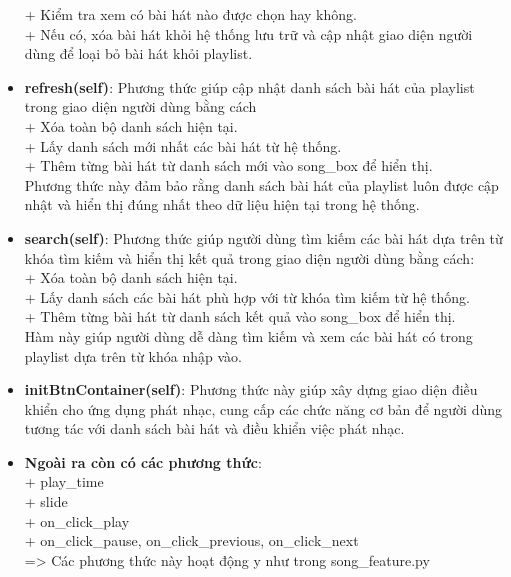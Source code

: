 \documentclass[a4paper]{article}
\begin{document}
\begin{itemize}
    + Kiểm tra xem có bài hát nào được chọn hay không. \\
    + Nếu có, xóa bài hát khỏi hệ thống lưu trữ và cập nhật giao diện người dùng để loại bỏ bài hát khỏi playlist.
    \item \textbf{refresh(self)}: Phương thức giúp cập nhật danh sách bài hát của playlist trong giao diện người dùng bằng cách \\
    + Xóa toàn bộ danh sách hiện tại. \\
    + Lấy danh sách mới nhất các bài hát từ hệ thống. \\
    + Thêm từng bài hát từ danh sách mới vào song\_box để hiển thị. \\
    Phương thức này đảm bảo rằng danh sách bài hát của playlist luôn được cập nhật và hiển thị đúng nhất theo dữ liệu hiện tại trong hệ thống.
    \item \textbf{search(self)}: Phương thức giúp người dùng tìm kiếm các bài hát dựa trên từ khóa tìm kiếm và hiển thị kết quả trong giao diện người dùng bằng cách: \\
    + Xóa toàn bộ danh sách hiện tại. \\
    + Lấy danh sách các bài hát phù hợp với từ khóa tìm kiếm từ hệ thống. \\
    + Thêm từng bài hát từ danh sách kết quả vào song\_box để hiển thị. \\
    Hàm này giúp người dùng dễ dàng tìm kiếm và xem các bài hát có trong playlist dựa trên từ khóa nhập vào.
    \item \textbf{initBtnContainer(self)}: Phương thức này giúp xây dựng giao diện điều khiển cho ứng dụng phát nhạc, cung cấp các chức năng cơ bản để người dùng tương tác với danh sách bài hát và điều khiển việc phát nhạc.
    \item \textbf{Ngoài ra còn có các phương thức}: \\
    + play\_time \\
    + slide \\
    + on\_click\_play \\
    + on\_click\_pause, on\_click\_previous, on\_click\_next \\
    => Các phương thức này hoạt động y như trong song\_feature.py
    
\end{itemize}
\end{document}
